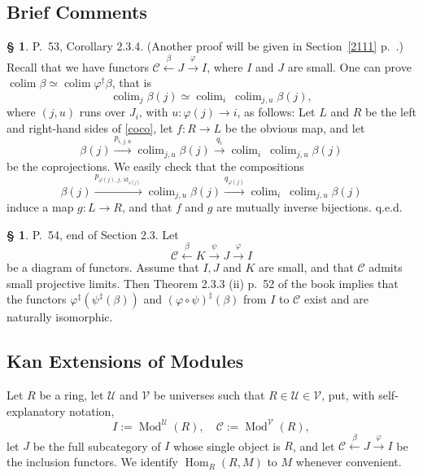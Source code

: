 \documentclass[12pt]{article}
\theoremstyle{remark}
\theoremstyle{definition}
\newtheorem{s}[thm]{\S}
\newcommand{\C}{\mathcal C}
\newcommand{\U}{\mathcal U}
\newcommand{\V}{\mathcal V}
\newcommand{\pp}{\varphi}
\newcommand{\xr}{\xrightarrow}
\DeclareMathOperator*{\colim}{colim}
\DeclareMathOperator{\id}{id}
\DeclareMathOperator{\Hom}{Hom}
\DeclareMathOperator{\Mod}{Mod}
\begin{document}

\subsection{Brief Comments}

\begin{s} P.~53, Corollary 2.3.4. (Another proof will be given in Section~\ref{2111} p.~\pageref{2111}.) Recall that we have functors $\C\xleftarrow\beta J\xrightarrow\pp I$, where $I$ and $J$ are small. One can prove $\colim\beta\simeq\colim\pp^\dagger\beta$, that is 
%
\begin{equation}\label{coco}
\colim_j\beta(j)\simeq\colim_i\ \colim_{j,u}\beta(j),
\end{equation} 
%
where $(j,u)$ runs over $J_i$, with $u:\pp(j)\to i$, as follows: Let $L$ and $R$ be the left and right-hand sides of \eqref{coco}, let $f:R\to L$ be the obvious map, and let
$$ 
\beta(j)\xrightarrow{p_{i,j,u}}\colim_{j,u}\beta(j)\xrightarrow{q_i}\colim_i\ \colim_{j,u}\beta(j)
$$ 
be the coprojections. We easily check that the compositions 
$$
\beta(j)\xrightarrow{p_{\pp(j),j,\id_{\pp(j)}}}\colim_{j,u}\beta(j)\xrightarrow{q_{\pp(j)}}\colim_i\ \colim_{j,u}\beta(j)
$$ 
induce a map $g:L\to R$, and that $f$ and $g$ are mutually inverse bijections. q.e.d.
\end{s} 

% 

\begin{s}\label{spreptom}
P.~54, end of Section 2.3. Let 
\begin{equation}\label{epreptom}
\C\xleftarrow\beta K\xr\psi J\xr\pp I
\end{equation} 
be a diagram of functors. Assume that $I,J$ and $K$ are small, and that $\C$ admits small projective limits. Then Theorem 2.3.3 (ii) p.~52 of the book implies that the functors $\pp^\ddagger(\psi^\ddagger(\beta))$ and $(\pp\circ\psi)^\ddagger(\beta)$ from $I$ to $\C$ exist and are naturally isomorphic. 
\end{s}

%

\subsection{Kan Extensions of Modules}

Let $R$ be a ring, let $\U$ and $\V$ be universes such that $R\in\U\in\V$, put, with self-explanatory notation, 
$$
I:=\Mod^\U(R),\quad\C:=\Mod^\V(R),
$$ 
let $J$ be the full subcategory of $I$ whose single object is $R$, and let $\C\xleftarrow\beta J\xr\pp I$ be the inclusion functors. We identify $\Hom_R(R,M)$ to $M$ whenever convenient. 
\end{document}

